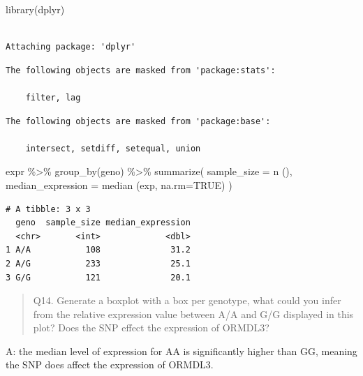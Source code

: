 \documentclass[
  letterpaper,
  DIV=11,
  numbers=noendperiod]{scrartcl}
\newenvironment{Shaded}{\begin{snugshade}}{\end{snugshade}}
\newcommand{\AttributeTok}[1]{\textcolor[rgb]{0.40,0.45,0.13}{#1}}
\newcommand{\ConstantTok}[1]{\textcolor[rgb]{0.56,0.35,0.01}{#1}}
\newcommand{\FunctionTok}[1]{\textcolor[rgb]{0.28,0.35,0.67}{#1}}
\newcommand{\NormalTok}[1]{\textcolor[rgb]{0.00,0.23,0.31}{#1}}
\newcommand{\SpecialCharTok}[1]{\textcolor[rgb]{0.37,0.37,0.37}{#1}}
\begin{document}
\begin{Shaded}
\begin{Highlighting}[]
\FunctionTok{library}\NormalTok{(dplyr)}
\end{Highlighting}
\end{Shaded}

\begin{verbatim}

Attaching package: 'dplyr'
\end{verbatim}

\begin{verbatim}
The following objects are masked from 'package:stats':

    filter, lag
\end{verbatim}

\begin{verbatim}
The following objects are masked from 'package:base':

    intersect, setdiff, setequal, union
\end{verbatim}

\begin{Shaded}
\begin{Highlighting}[]
\NormalTok{expr }\SpecialCharTok{\%\textgreater{}\%}
  \FunctionTok{group\_by}\NormalTok{(geno) }\SpecialCharTok{\%\textgreater{}\%}
  \FunctionTok{summarize}\NormalTok{(}
    \AttributeTok{sample\_size =} \FunctionTok{n}\NormalTok{ (),}
    \AttributeTok{median\_expression =} \FunctionTok{median}\NormalTok{ (exp, }\AttributeTok{na.rm=}\ConstantTok{TRUE}\NormalTok{)}
\NormalTok{  )}
\end{Highlighting}
\end{Shaded}

\begin{verbatim}
# A tibble: 3 x 3
  geno  sample_size median_expression
  <chr>       <int>             <dbl>
1 A/A           108              31.2
2 A/G           233              25.1
3 G/G           121              20.1
\end{verbatim}

\begin{quote}
Q14. Generate a boxplot with a box per genotype, what could you infer
from the relative expression value between A/A and G/G displayed in this
plot? Does the SNP effect the expression of ORMDL3?
\end{quote}

A: the median level of expression for A\textbar A is significantly
higher than G\textbar G, meaning the SNP does affect the expression of
ORMDL3.
\end{document}
